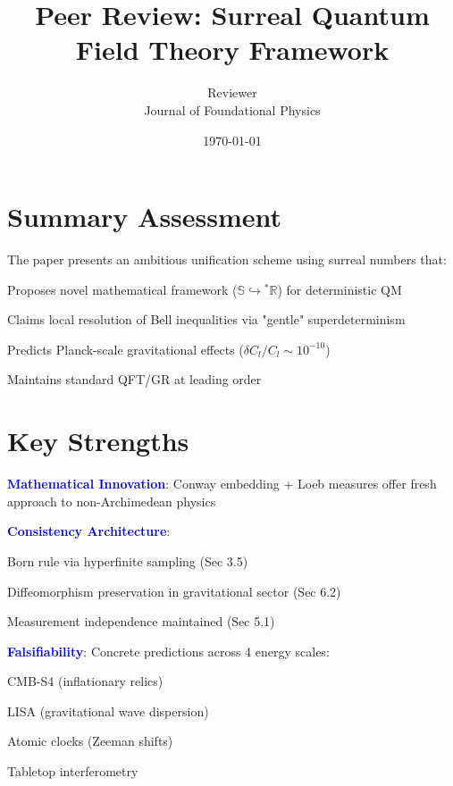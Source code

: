 \documentclass{article}
\begin{document}
\title{Peer Review: Surreal Quantum Field Theory Framework}
\author{Reviewer \\ Journal of Foundational Physics}
\date{\today}
\maketitle

\section{Summary Assessment}
The paper presents an ambitious unification scheme using surreal numbers that:
\begin{compactitem}
\item Proposes novel mathematical framework ($\mathbb{S}\hookrightarrow{}^*\mathbb{R}$) for deterministic QM
\item Claims local resolution of Bell inequalities via "gentle" superdeterminism
\item Predicts Planck-scale gravitational effects ($\delta C_l/C_l\sim10^{-10}$) 
\item Maintains standard QFT/GR at leading order
\end{compactitem}

\section{Key Strengths}
\begin{compactitem}
\item \textcolor{blue}{\textbf{Mathematical Innovation}}: Conway embedding + Loeb measures offer fresh approach to non-Archimedean physics

\item \textcolor{blue}{\textbf{Consistency Architecture}}:
\begin{compactitem}
\item Born rule via hyperfinite sampling (Sec 3.5)
\item Diffeomorphism preservation in gravitational sector (Sec 6.2)
\item Measurement independence maintained (Sec 5.1)
\end{compactitem}

\item \textcolor{blue}{\textbf{Falsifiability}}: Concrete predictions across 4 energy scales:
\begin{compactitem}
\item CMB-S4 (inflationary relics)
\item LISA (gravitational wave dispersion)
\item Atomic clocks (Zeeman shifts)
\item Tabletop interferometry
\end{compactitem}
\end{compactitem}
\end{document}
